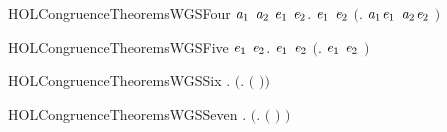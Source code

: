 \newcommand{\HOLCongruenceTheoremsWGSThree}{\UseVerbatim{HOLCongruenceTheoremsWGSThree}}
\begin{SaveVerbatim}{HOLCongruenceTheoremsWGSFour}
\HOLTokenTurnstile{} \HOLSymConst{\HOLTokenForall{}}\ensuremath{\HOLBoundVar{a}\sb{\mathrm{1}}} \ensuremath{\HOLBoundVar{a}\sb{\mathrm{2}}} \ensuremath{\HOLBoundVar{e}\sb{\mathrm{1}}} \ensuremath{\HOLBoundVar{e}\sb{\mathrm{2}}}.
        \ensuremath{\HOLBoundVar{e}\sb{\mathrm{1}}} \HOLSymConst{\HOLTokenConj{}}  \ensuremath{\HOLBoundVar{e}\sb{\mathrm{2}}} \HOLSymConst{\HOLTokenImp{}}  \ensuremath{(}\HOLTokenLambda{}. \ensuremath{\HOLBoundVar{a}\sb{\mathrm{1}}}\HOLSymConst{\ensuremath{\ldotp}}\ensuremath{\HOLBoundVar{e}\sb{\mathrm{1}}}  \HOLSymConst{\ensuremath{+}} \ensuremath{\HOLBoundVar{a}\sb{\mathrm{2}}}\HOLSymConst{\ensuremath{\ldotp}}\ensuremath{\HOLBoundVar{e}\sb{\mathrm{2}}} \ensuremath{)}
\end{SaveVerbatim}
\newcommand{\HOLCongruenceTheoremsWGSFour}{\UseVerbatim{HOLCongruenceTheoremsWGSFour}}
\begin{SaveVerbatim}{HOLCongruenceTheoremsWGSFive}
\HOLTokenTurnstile{} \HOLSymConst{\HOLTokenForall{}}\ensuremath{\HOLBoundVar{e}\sb{\mathrm{1}}} \ensuremath{\HOLBoundVar{e}\sb{\mathrm{2}}}.  \ensuremath{\HOLBoundVar{e}\sb{\mathrm{1}}} \HOLSymConst{\HOLTokenConj{}}  \ensuremath{\HOLBoundVar{e}\sb{\mathrm{2}}} \HOLSymConst{\HOLTokenImp{}}  \ensuremath{(}\HOLTokenLambda{}. \ensuremath{\HOLBoundVar{e}\sb{\mathrm{1}}}  \HOLSymConst{\ensuremath{\mid}} \ensuremath{\HOLBoundVar{e}\sb{\mathrm{2}}} \ensuremath{)}
\end{SaveVerbatim}
\newcommand{\HOLCongruenceTheoremsWGSFive}{\UseVerbatim{HOLCongruenceTheoremsWGSFive}}
\begin{SaveVerbatim}{HOLCongruenceTheoremsWGSSix}
\HOLTokenTurnstile{} \HOLSymConst{\HOLTokenForall{}} .   \HOLSymConst{\HOLTokenImp{}}  \ensuremath{(}\HOLTokenLambda{}.   \ensuremath{(} \ensuremath{)}\ensuremath{)}
\end{SaveVerbatim}
\newcommand{\HOLCongruenceTheoremsWGSSix}{\UseVerbatim{HOLCongruenceTheoremsWGSSix}}
\begin{SaveVerbatim}{HOLCongruenceTheoremsWGSSeven}
\HOLTokenTurnstile{} \HOLSymConst{\HOLTokenForall{}} .   \HOLSymConst{\HOLTokenImp{}}  \ensuremath{(}\HOLTokenLambda{}.  \ensuremath{(} \ensuremath{)} \ensuremath{)}
\end{SaveVerbatim}
